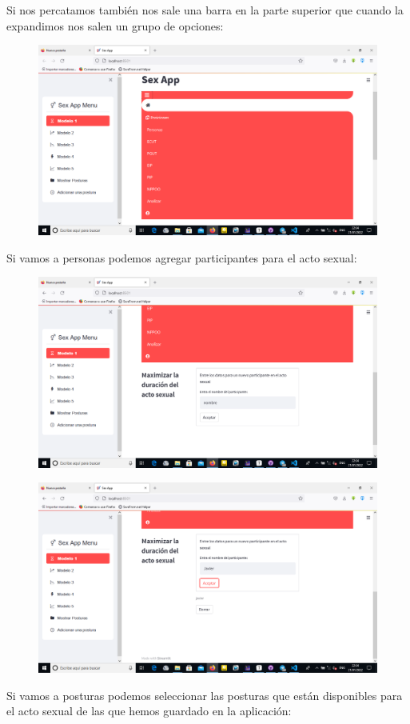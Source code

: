 \documentclass{llncs}
\begin{document}
Si nos percatamos también nos sale una barra en la parte superior que cuando la expandimos nos salen un grupo de opciones:

\begin{figure}
	\centering
	\includegraphics[width=0.7\linewidth]{Imagenes/aplicacion/web5}
	\label{fig:web5}
\end{figure}

Si vamos a personas podemos agregar participantes para el acto sexual:

\begin{figure}
	\centering
	\includegraphics[width=0.7\linewidth]{Imagenes/aplicacion/web6}
	\label{fig:web6}
\end{figure}
\begin{figure}
	\centering
	\includegraphics[width=0.7\linewidth]{Imagenes/aplicacion/web7}
	\label{fig:web7}
\end{figure}

Si vamos a posturas podemos seleccionar las posturas que están disponibles para el acto sexual de las que hemos guardado en la aplicación:
\end{document}
